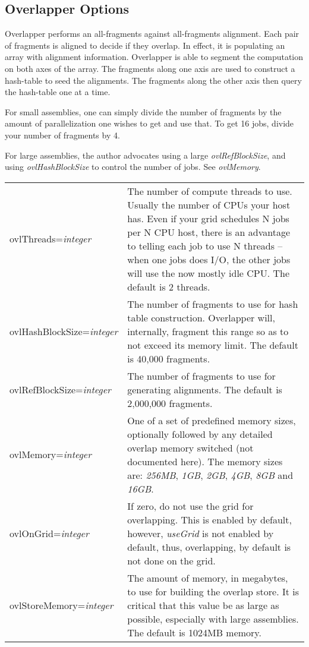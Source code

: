 \documentclass[twoside,11pt]{article}
\begin{document}
\subsection{Overlapper Options}
\label{sec:overlapopts}

Overlapper performs an all-fragments against all-fragments alignment.
Each pair of fragments is aligned to decide if they overlap.  In
effect, it is populating an array with alignment information.
Overlapper is able to segment the computation on both axes of the
array.  The fragments along one axis are used to construct a
hash-table to seed the alignments.  The fragments along the other axis
then query the hash-table one at a time.

For small assemblies, one can simply divide the number of fragments by
the amount of parallelization one wishes to get and use that.  To get
16 jobs, divide your number of fragments by 4.

For large assemblies, the author advocates using a large {\it
ovlRefBlockSize}, and using {\it ovlHashBlockSize} to control the number of
jobs.  See {\it ovlMemory}.

\begin{longtable}{lp{3.0in}}
ovlThreads={\it integer} &
The number of compute threads to use.  Usually the number of CPUs your
host has.  Even if your grid schedules N jobs per N CPU host, there is
an advantage to telling each job to use N threads -- when one jobs
does I/O, the other jobs will use the now mostly idle CPU.  The default is 2 threads.
\\

ovlHashBlockSize={\it integer} &
The number of fragments to use for hash table construction.
Overlapper will, internally, fragment this range so as to not exceed
its memory limit.  The default is 40,000 fragments.
\\

ovlRefBlockSize={\it integer} &
The number of fragments to use for generating alignments.  The default
is 2,000,000 fragments.
\\

ovlMemory={\it integer} &
One of a set of predefined memory sizes, optionally followed by any
detailed overlap memory switched (not documented here).  The memory sizes are:
{\it 256MB},
{\it 1GB},
{\it 2GB},
{\it 4GB},
{\it 8GB} and
{\it 16GB}.
\\

ovlOnGrid={\it integer} &
If zero, do not use the grid for overlapping.  This is enabled by
default, however, {\em useGrid} is not enabled by default, thus,
overlapping, by default is not done on the grid.
\\

ovlStoreMemory={\it integer} &
The amount of memory, in megabytes, to use for building the overlap
store.  It is critical that this value be as large as possible,
especially with large assemblies.  The default is 1024MB memory.
\\
\end{longtable}
\end{document}
